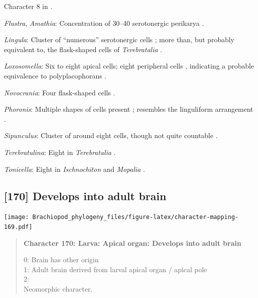 \documentclass[openany]{book}
\begin{document}
Character 8 in \citet{Haszprunar2008}.

\hypertarget{Amathia-coding-169}{}
\emph{Flustra}, \emph{Amathia}: Concentration of 30--40 serotonergic
perikarya \citep[in \emph{Fredericella};][]{Gruhl2010F}.

\hypertarget{Lingula-coding-169}{}
\emph{Lingula}: Cluster of ``numerous'' serotonergic cells
\citep{HaySchmidt1992, Altenburger2010}; more than, but probably
equivalent to, the flask-shaped cells of \emph{Terebratalia}
\citep{Luter2016}.

\hypertarget{Loxosomella-coding-169}{}
\emph{Loxosomella}: Six to eight apical cells; eight peripheral cells
\citep{Wanninger2007}, indicating a probable equivalence to
polyplacophorans \citep{Haszprunar2008}.

\hypertarget{Novocrania-coding-169}{}
\emph{Novocrania}: Four flask-shaped cells \citep{Altenburger2010}.

\hypertarget{Phoronis-coding-169}{}
\emph{Phoronis}: Multiple shapes of cells present \citep{Santagata2002};
resembles the linguliform arrangement \citep{Altenburger2010}.

\hypertarget{Sipunculus-coding-169}{}
\emph{Sipunculus}: Cluster of around eight cells, though not quite
countable \citep{Wanninger2005}.

\hypertarget{Terebratulina-coding-169}{}
\emph{Terebratulina}: Eight in \emph{Terebratalia} \citep{Luter2016}.

\hypertarget{Tonicella-coding-169}{}
\emph{Tonicella}: Eight in \emph{Ischnochiton} and \emph{Mopalia}
\citep{Wanninger2007}.

\subsection*{{[}170{]} Develops into adult
brain}\label{develops-into-adult-brain}

\texttt{[image: Brachiopod\_phylogeny\_files/figure-latex/character-mapping-169.pdf]}

\begin{quote}
\textbf{Character 170: Larva: Apical organ: Develops into adult brain}

0: Brain has other origin\\
1: Adult brain derived from larval apical organ / apical pole\\
2:\\
Neomorphic character.
\end{quote}
\end{document}
